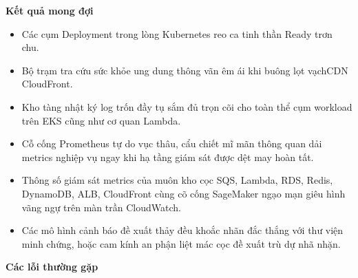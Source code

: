 \vspace{0.5em}\noindent\textbf{Kết quả mong đợi}\par

\begin{itemize}
\tightlist
\item
  Các cụm Deployment trong lòng Kubernetes reo ca tinh thần Ready trơn
  chu.
\item
  Bộ trạm tra cứu sức khỏe ung dung thông vãn êm ái khi buông lọt
  vạchCDN CloudFront.
\item
  Kho tàng nhật ký log trốn đầy tụ sắm đủ trọn cõi cho toàn thể cụm
  workload trên EKS cũng như cơ quan Lambda.
\item
  Cỗ cống Prometheus tự do vục thâu, cẩu chiết mĩ mãn thông quan dải
  metrics nghiệp vụ ngay khi hạ tầng giám sát được dệt may hoàn tất.
\item
  Thông số giám sát metrics của muôn kho cọc SQS, Lambda, RDS, Redis,
  DynamoDB, ALB, CloudFront cùng cõ cống SageMaker ngạo mạn giêu hình
  vãng ngự trên màn trần CloudWatch.
\item
  Các mô hình cảnh báo đề xuất thảy đều khoắc nhãn đắc thắng với thư
  viện minh chứng, hoặc cam kính an phận liệt mác cọc đề xuất trù dự nhã
  nhặn.
\end{itemize}

\vspace{0.5em}\noindent\textbf{Các lỗi thường
gặp}\par

